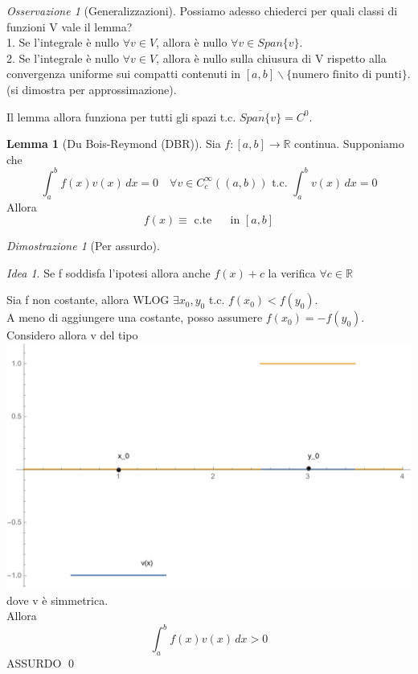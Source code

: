 \documentclass[a4paper]{book}
\theoremstyle{definition}
\theoremstyle{remark}
\newtheorem{oss}{Osservazione}
\newtheorem{dimst}{Dimostrazione}
\newtheorem{idea}{Idea}
\theoremstyle{definition}
\newtheorem{lem}{Lemma}
\newcommand{\bbr}{\mathbb{R}}
\begin{document}
\begin{oss}[Generalizzazioni]
Possiamo adesso chiederci per quali classi di funzioni V vale il lemma?\\
1. Se l'integrale è nullo $\forall v \in V$, allora è nullo $\forall v \in Span\{v\}$.\\
2. Se l'integrale è nullo $\forall v \in V$, allora è nullo sulla chiusura di V rispetto alla convergenza uniforme sui compatti contenuti in $[a,b] \smallsetminus \{\text{numero finito di punti}\} $. (si dimostra per approssimazione).
\end{oss}

Il lemma allora funziona per tutti gli spazi t.c. $\overline{Span\{v\}} = C^0 $.

\begin{lem}[Du Bois-Reymond (DBR)]
Sia $f:[a,b]\to\bbr $ continua. Supponiamo che 
\[
	\int_a^b f(x)v(x)\,dx = 0\quad \forall v \in C^\infty_c((a, b)) \text{ t.c. } \int_a^b v(x)\,dx = 0
\]
Allora
\[
	f(x) \equiv \text{ c.te } \quad \text{ in } [a,b]
\]
\end{lem}

\begin{dimst}[Per assurdo]
\begin{idea}
Se f soddisfa l'ipotesi allora anche $f(x) + c$ la verifica $\forall c \in \bbr$
\end{idea}
Sia f non costante, allora WLOG $\exists x_0,y_0 $ t.c. $f(x_0) < f(y_0)$.\\
A meno di aggiungere una costante, posso assumere $f(x_0) = -f(y_0)$.\\
Considero allora v del tipo\\ 
\includegraphics[scale=0.4]{dbr.pdf}
dove v è simmetrica.\\
Allora
\[
	\int_a^b f(x)v(x)\,dx > 0
\]
ASSURDO \qed
\end{dimst}
\end{document}
